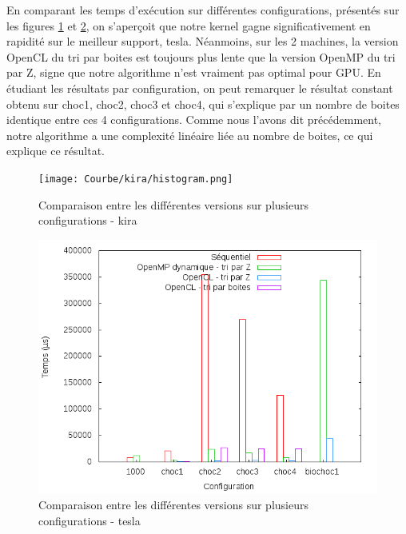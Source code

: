 \documentclass[]{article}
\begin{document}
En comparant les temps d'exécution sur différentes configurations, présentés sur les figures \ref{fig:histo-kira} et \ref{fig:histo-tesla}, on s'aperçoit que notre kernel gagne significativement en rapidité sur le meilleur support, tesla. Néanmoins, sur les 2 machines, la version OpenCL du tri par boites est toujours plus lente que la version OpenMP du tri par Z, signe que notre algorithme n'est vraiment pas optimal pour GPU.
En étudiant les résultats par configuration, on peut remarquer le résultat constant obtenu sur choc1, choc2, choc3 et choc4, qui s'explique par un nombre de boites identique entre ces 4 configurations. Comme nous l'avons dit précédemment, notre algorithme a une complexité linéaire liée au nombre de boites, ce qui explique ce résultat.

\begin{figure}[H]
  \centering
  \texttt{[image: Courbe/kira/histogram.png]} 
  \caption{Comparaison entre les différentes versions sur plusieurs configurations - kira}
  \label{fig:histo-kira}
\end{figure}


\begin{figure}[H]
  \centering
  \includegraphics[scale=0.5]{Courbe/tesla/histo/histogram.png} 
  \caption{Comparaison entre les différentes versions sur plusieurs configurations - tesla}
  \label{fig:histo-tesla}
\end{figure}
\end{document}
